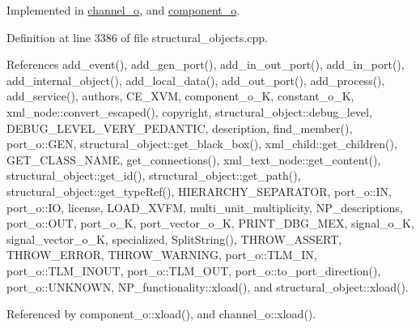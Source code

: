 Implemented in \hyperlink{classchannel__o_aa3a1b88c7d037f8712d927e4e27db8ce}{channel\+\_\+o}, and \hyperlink{classcomponent__o_a988fbc4d1b4b677c8384c5781917dd1f}{component\+\_\+o}.



Definition at line 3386 of file structural\+\_\+objects.\+cpp.



References add\+\_\+event(), add\+\_\+gen\+\_\+port(), add\+\_\+in\+\_\+out\+\_\+port(), add\+\_\+in\+\_\+port(), add\+\_\+internal\+\_\+object(), add\+\_\+local\+\_\+data(), add\+\_\+out\+\_\+port(), add\+\_\+process(), add\+\_\+service(), authors, C\+E\+\_\+\+X\+VM, component\+\_\+o\+\_\+K, constant\+\_\+o\+\_\+K, xml\+\_\+node\+::convert\+\_\+escaped(), copyright, structural\+\_\+object\+::debug\+\_\+level, D\+E\+B\+U\+G\+\_\+\+L\+E\+V\+E\+L\+\_\+\+V\+E\+R\+Y\+\_\+\+P\+E\+D\+A\+N\+T\+IC, description, find\+\_\+member(), port\+\_\+o\+::\+G\+EN, structural\+\_\+object\+::get\+\_\+black\+\_\+box(), xml\+\_\+child\+::get\+\_\+children(), G\+E\+T\+\_\+\+C\+L\+A\+S\+S\+\_\+\+N\+A\+ME, get\+\_\+connections(), xml\+\_\+text\+\_\+node\+::get\+\_\+content(), structural\+\_\+object\+::get\+\_\+id(), structural\+\_\+object\+::get\+\_\+path(), structural\+\_\+object\+::get\+\_\+type\+Ref(), H\+I\+E\+R\+A\+R\+C\+H\+Y\+\_\+\+S\+E\+P\+A\+R\+A\+T\+OR, port\+\_\+o\+::\+IN, port\+\_\+o\+::\+IO, license, L\+O\+A\+D\+\_\+\+X\+V\+FM, multi\+\_\+unit\+\_\+multiplicity, N\+P\+\_\+descriptions, port\+\_\+o\+::\+O\+UT, port\+\_\+o\+\_\+K, port\+\_\+vector\+\_\+o\+\_\+K, P\+R\+I\+N\+T\+\_\+\+D\+B\+G\+\_\+\+M\+EX, signal\+\_\+o\+\_\+K, signal\+\_\+vector\+\_\+o\+\_\+K, specialized, Split\+String(), T\+H\+R\+O\+W\+\_\+\+A\+S\+S\+E\+RT, T\+H\+R\+O\+W\+\_\+\+E\+R\+R\+OR, T\+H\+R\+O\+W\+\_\+\+W\+A\+R\+N\+I\+NG, port\+\_\+o\+::\+T\+L\+M\+\_\+\+IN, port\+\_\+o\+::\+T\+L\+M\+\_\+\+I\+N\+O\+UT, port\+\_\+o\+::\+T\+L\+M\+\_\+\+O\+UT, port\+\_\+o\+::to\+\_\+port\+\_\+direction(), port\+\_\+o\+::\+U\+N\+K\+N\+O\+WN, N\+P\+\_\+functionality\+::xload(), and structural\+\_\+object\+::xload().



Referenced by component\+\_\+o\+::xload(), and channel\+\_\+o\+::xload().

